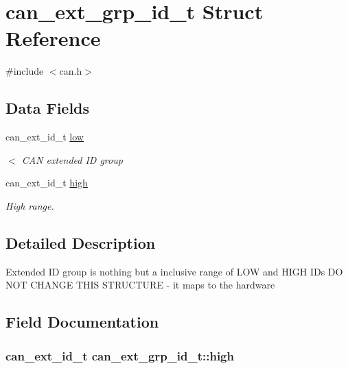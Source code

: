 \hypertarget{structcan__ext__grp__id__t}{}\section{can\+\_\+ext\+\_\+grp\+\_\+id\+\_\+t Struct Reference}
\label{structcan__ext__grp__id__t}


{\ttfamily \#include $<$can.\+h$>$}

\subsection*{Data Fields}
\begin{DoxyCompactItemize}
\item 
can\+\_\+ext\+\_\+id\+\_\+t \hyperlink{structcan__ext__grp__id__t_a7c123b7e277f204b82144552a55d93af}{low}
\begin{DoxyCompactList}\small\item\em $<$ C\+AN extended ID group \end{DoxyCompactList}\item 
can\+\_\+ext\+\_\+id\+\_\+t \hyperlink{structcan__ext__grp__id__t_a8ef0cc460e362babe6657bfa54f7c22a}{high}
\begin{DoxyCompactList}\small\item\em High range. \end{DoxyCompactList}\end{DoxyCompactItemize}


\subsection{Detailed Description}
Extended ID group is nothing but a inclusive range of L\+OW and H\+I\+GH I\+Ds DO N\+OT C\+H\+A\+N\+GE T\+H\+IS S\+T\+R\+U\+C\+T\+U\+RE -\/ it maps to the hardware 

\subsection{Field Documentation}
\subsubsection[{\texorpdfstring{high}{high}}]{\setlength{\rightskip}{0pt plus 5cm}can\+\_\+ext\+\_\+id\+\_\+t can\+\_\+ext\+\_\+grp\+\_\+id\+\_\+t\+::high}\hypertarget{structcan__ext__grp__id__t_a8ef0cc460e362babe6657bfa54f7c22a}{}\label{structcan__ext__grp__id__t_a8ef0cc460e362babe6657bfa54f7c22a}


